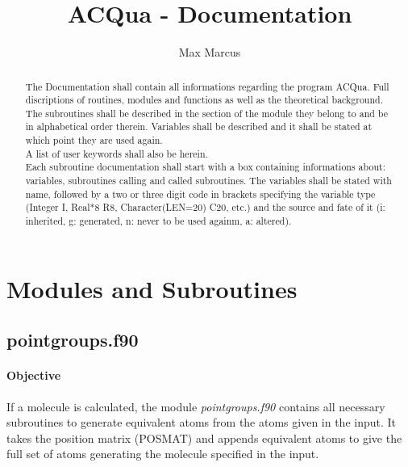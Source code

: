 \documentclass[a4paper,10pt]{scrartcl}
\title{ACQua - Documentation}
\author{Max Marcus}
\begin{document}
\maketitle

\begin{abstract}
The Documentation shall contain all informations regarding the program ACQua. Full discriptions of routines, modules and functions as well as
the theoretical background.\\
The subroutines shall be described in the section of the module they belong to and be in alphabetical order therein. Variables shall be described
and it shall be stated at which point they are used again.\\
A list of user keywords shall also be herein.\\
Each subroutine documentation shall start with a box containing informations about: variables, subroutines calling and called subroutines. The variables
shall be stated with name, followed by a two or three digit code in brackets specifying the variable type (Integer I, Real*8 R8, Character(LEN=20) C20, etc.)
and the source and fate of it (i: inherited, g: generated, n: never to be used againm, a: altered).
\end{abstract}

\tableofcontents

\section{Modules and Subroutines}

\subsection{pointgroups.f90}
\paragraph{Objective}
If a molecule is calculated, the module \emph{pointgroups.f90} contains all necessary subroutines to generate equivalent atoms from the atoms given in
the input. It takes the position matrix (POSMAT) and appends equivalent atoms to give the full set of atoms generating the molecule specified in the input.\\
\end{document}
